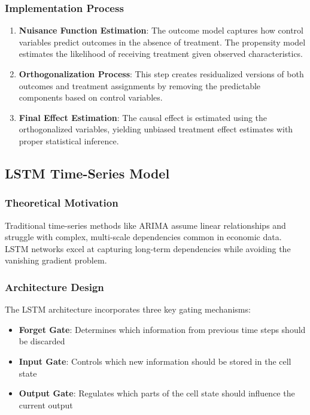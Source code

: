\subsubsection{Implementation Process}
\begin{enumerate}
    \item \textbf{Nuisance Function Estimation}: The outcome model captures how control variables predict outcomes in the absence of treatment. The propensity model estimates the likelihood of receiving treatment given observed characteristics.
    \item \textbf{Orthogonalization Process}: This step creates residualized versions of both outcomes and treatment assignments by removing the predictable components based on control variables.
    \item \textbf{Final Effect Estimation}: The causal effect is estimated using the orthogonalized variables, yielding unbiased treatment effect estimates with proper statistical inference.
\end{enumerate}

\subsection{LSTM Time-Series Model}\label{subsec:lstm}

\subsubsection{Theoretical Motivation}
Traditional time-series methods like ARIMA assume linear relationships and struggle with complex, multi-scale dependencies common in economic data. LSTM networks excel at capturing long-term dependencies while avoiding the vanishing gradient problem.

\subsubsection{Architecture Design}
The LSTM architecture incorporates three key gating mechanisms:
\begin{itemize}
    \item \textbf{Forget Gate}: Determines which information from previous time steps should be discarded
    \item \textbf{Input Gate}: Controls which new information should be stored in the cell state
    \item \textbf{Output Gate}: Regulates which parts of the cell state should influence the current output
\end{itemize}


